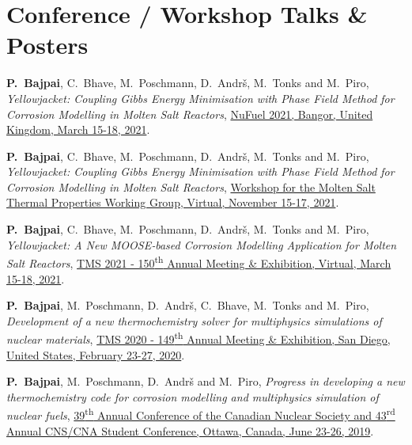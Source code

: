 \section*{Conference / Workshop Talks \& Posters}
\vspace*{1em}
\begin{enumerate}{\small\compresslist
\item \textbf{P.\ Bajpai}, {C.\ Bhave}, {M.\ Poschmann}, {D.\ Andr\v{s}}, {M.\ Tonks} and {M.\ Piro}, \textit{Yellowjacket: Coupling Gibbs Energy Minimisation with Phase Field Method for Corrosion Modelling in Molten Salt Reactors}, \href{https://nubu.nu/events/nufuel-workshop/}{NuFuel 2021, Bangor, United Kingdom, March 15-18, 2021}.
\item \textbf{P.\ Bajpai}, {C.\ Bhave}, {M.\ Poschmann}, {D.\ Andr\v{s}}, {M.\ Tonks} and {M.\ Piro}, \textit{Yellowjacket: Coupling Gibbs Energy Minimisation with Phase Field Method for Corrosion Modelling in Molten Salt Reactors}, \href{}{Workshop for the Molten Salt Thermal Properties Working Group, Virtual, November 15-17, 2021}.
\item \textbf{P.\ Bajpai}, {C.\ Bhave}, {M.\ Poschmann}, {D.\ Andr\v{s}}, {M.\ Tonks} and {M.\ Piro}, \textit{Yellowjacket: A New MOOSE‐based Corrosion Modelling Application for Molten Salt Reactors}, \href{https://www.tms.org/TMS2021}{TMS 2021  - 150\textsuperscript{th} Annual Meeting \& Exhibition, Virtual, March 15-18, 2021}.
\item \textbf{P.\ Bajpai}, {M.\ Poschmann}, {D.\ Andr\v{s}}, {C.\ Bhave}, {M.\ Tonks} and {M.\ Piro}, \textit{Development of a new thermochemistry solver for multiphysics simulations of nuclear materials}, \href{https://www.tms.org/TMS2020}{TMS 2020  - 149\textsuperscript{th} Annual Meeting \& Exhibition, San Diego, United States, February 23-27, 2020}.
\item \textbf{P.\ Bajpai}, {M.\ Poschmann}, {D.\ Andr\v{s}} and {M.\ Piro}, \textit{Progress in developing a new thermochemistry code for corrosion modelling and multiphysics simulation of nuclear fuels}, \href{http://cns-annual-conference.org/2019/index.html}{39\textsuperscript{th} Annual Conference of the Canadian Nuclear Society and 43\textsuperscript{rd} Annual CNS/CNA Student Conference, Ottawa, Canada, June 23-26, 2019}.
}\end{enumerate}



